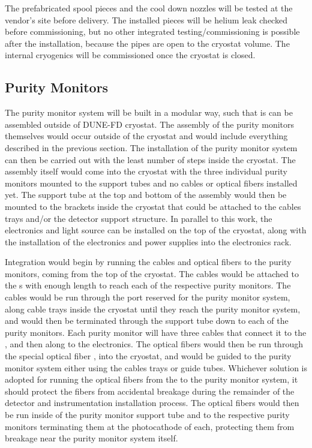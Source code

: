 The prefabricated spool pieces and the cool down nozzles will be tested at the vendor's site before delivery. The installed pieces will be helium leak checked before commissioning, but no other integrated testing/commissioning is possible after the installation, because the pipes are open to the cryostat volume. The internal cryogenics will be commissioned once the cryostat is closed.


\subsection{Purity Monitors}
\label{sec:fdgen-slow-cryo-instal-pm}

The purity monitor system will be built in a modular way, such that is can be assembled outside of DUNE-FD cryostat.  The assembly of the purity monitors themselves would occur outside of the cryostat and would include everything described in the previous section.  The installation of the purity monitor system can then be carried out with the least number of steps inside the cryostat.  The assembly itself would come into the cryostat with the three individual purity monitors mounted to the support tubes and no  cables or optical fibers installed yet.  The support tube at the top and bottom of the assembly would then be mounted to the brackets inside the cryostat that could be attached to the cables trays and/or the detector support structure.  In parallel to this work, the  electronics and light source can be installed on the top of the cryostat, along with the installation of the electronics and power supplies into the electronics rack.  

Integration would begin by running the  cables and optical fibers to the purity monitors, coming from the top of the cryostat.  The  cables would be attached to the  \fdth{}s with enough length to reach each of the respective purity monitors.  The cables would be run through the port reserved for the purity monitor system, along cable trays inside the cryostat until they reach the purity monitor system, and would then be terminated through the support tube down to each of the purity monitors.  Each purity monitor will have three  cables that connect it to the \fdth, and then along to the  electronics.  The optical fibers would then be run through the special optical fiber \fdth, into the cryostat, and would be guided to the purity monitor system either using the cables trays or guide tubes.  Whichever solution is adopted for running the optical fibers from the \fdth to the purity monitor system, it should protect the fibers from accidental breakage during the remainder of the detector and instrumentation installation process.  The optical fibers would then be run inside of the purity monitor support tube and to the respective purity monitors terminating them at the photocathode of each, protecting them from breakage near the purity monitor system itself.


